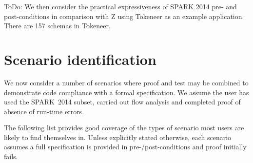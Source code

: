 \documentclass{llncs}
\newcommand{\newspark}{SPARK~2014\xspace}
\begin{document}
ToDo: 
We then consider the practical expressiveness of SPARK 2014 pre- and
post-conditions in comparison with Z using Tokeneer as an example
application.  There are 157 schemas in Tokeneer.


\section{Scenario identification}

We now consider a number of scenarios where proof and test may be combined to demonstrate code compliance with a formal specification. We assume the user has used the \newspark subset, carried out flow analysis and completed proof of absence of run-time errors.

The following list provides good coverage of the types of scenario most users are likely to find themselves in. Unless explicitly stated otherwise, each scenario assumes a full specification is provided in pre-/post-conditions and proof initially fails.
\end{document}
